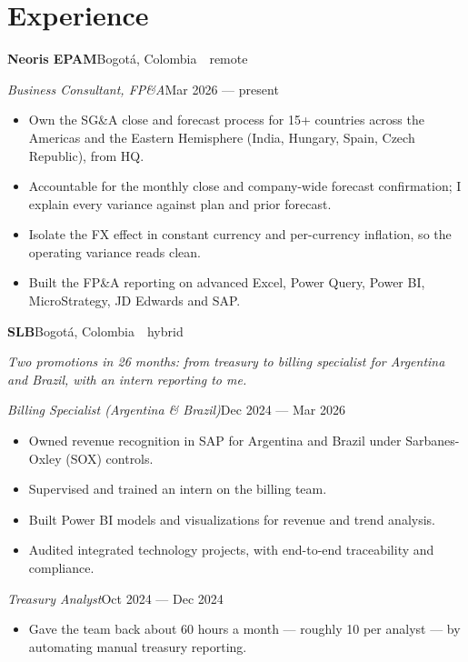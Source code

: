\documentclass[a4paper,10pt]{article}
\newcommand{\row}[2]{\textbf{\color{ink}#1}\hfill{\small #2}\par}
\begin{document}
\section*{Experience}
\row{Neoris EPAM}{Bogotá, Colombia \,\textperiodcentered\, remote}
\textit{Business Consultant, FP\&A}\hfill{\small Mar 2026 --- present}\par
\begin{itemize}[leftmargin=1em, itemsep=0pt, topsep=1pt, parsep=0pt]
  \item Own the SG\&A close and forecast process for 15+ countries across the Americas and the Eastern Hemisphere (India, Hungary, Spain, Czech Republic), from HQ.
  \item Accountable for the monthly close and company-wide forecast confirmation; I explain every variance against plan and prior forecast.
  \item Isolate the FX effect in constant currency and per-currency inflation, so the operating variance reads clean.
  \item Built the FP\&A reporting on advanced Excel, Power Query, Power BI, MicroStrategy, JD Edwards and SAP.
\end{itemize}
\vspace{2pt}
\row{SLB}{Bogotá, Colombia \,\textperiodcentered\, hybrid}
{\small\itshape\color{cold} Two promotions in 26 months: from treasury to billing specialist for Argentina and Brazil, with an intern reporting to me.}\par
\textit{Billing Specialist (Argentina \& Brazil)}\hfill{\small Dec 2024 --- Mar 2026}\par
\begin{itemize}[leftmargin=1em, itemsep=0pt, topsep=1pt, parsep=0pt]
  \item Owned revenue recognition in SAP for Argentina and Brazil under Sarbanes-Oxley (SOX) controls.
  \item Supervised and trained an intern on the billing team.
  \item Built Power BI models and visualizations for revenue and trend analysis.
  \item Audited integrated technology projects, with end-to-end traceability and compliance.
\end{itemize}
\textit{Treasury Analyst}\hfill{\small Oct 2024 --- Dec 2024}\par
\begin{itemize}[leftmargin=1em, itemsep=0pt, topsep=1pt, parsep=0pt]
  \item Gave the team back about 60 hours a month --- roughly 10 per analyst --- by automating manual treasury reporting.
\end{itemize}
\end{document}

